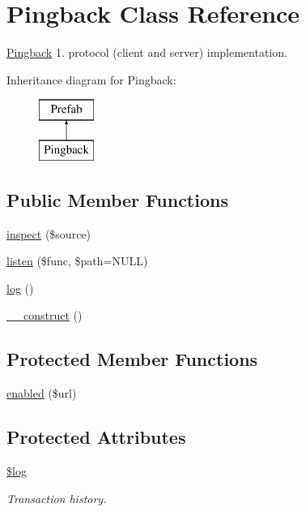 \hypertarget{class_web_1_1_pingback}{}\section{Pingback Class Reference}
\label{class_web_1_1_pingback}


\hyperlink{class_web_1_1_pingback}{Pingback} 1. protocol (client and server) implementation.  


Inheritance diagram for Pingback\+:\begin{figure}[H]
\begin{center}
\leavevmode
\includegraphics[height=2.000000cm]{class_web_1_1_pingback}
\end{center}
\end{figure}
\subsection*{Public Member Functions}
\begin{DoxyCompactItemize}
\item 
\hyperlink{class_web_1_1_pingback_af2f57c4ad56194df3b169d4993d49dbb}{inspect} (\$source)
\item 
\hyperlink{class_web_1_1_pingback_aa1f607b468feb8edba01ef661f980294}{listen} (\$func, \$path=N\+U\+LL)
\item 
\hyperlink{class_web_1_1_pingback_a5e06d9b7f0033278f40a41d081efbe71}{log} ()
\item 
\hyperlink{class_web_1_1_pingback_a095c5d389db211932136b53f25f39685}{\+\_\+\+\_\+construct} ()
\end{DoxyCompactItemize}
\subsection*{Protected Member Functions}
\begin{DoxyCompactItemize}
\item 
\hyperlink{class_web_1_1_pingback_a40d5adaa4e43f4c875ad081d7118ce4e}{enabled} (\$url)
\end{DoxyCompactItemize}
\subsection*{Protected Attributes}
\begin{DoxyCompactItemize}
\item 
\hypertarget{class_web_1_1_pingback_a9a2cf15a653aee8be437f7ae474cd494}{}\label{class_web_1_1_pingback_a9a2cf15a653aee8be437f7ae474cd494} 
\hyperlink{class_web_1_1_pingback_a9a2cf15a653aee8be437f7ae474cd494}{\$log}
\begin{DoxyCompactList}\small\item\em Transaction history. \end{DoxyCompactList}\end{DoxyCompactItemize}
